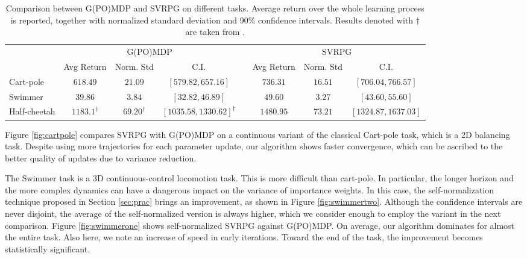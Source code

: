 \documentclass{article}
\theoremstyle{remark}
\theoremstyle{definition}
\begin{document}
\begin{table}[t]
	\caption{
		\label{tab:1}
		Comparison between G(PO)MDP and SVRPG on different tasks. Average return over the whole learning process is reported, together with normalized standard deviation and 90\% confidence intervals. Results denoted with $\dagger$ are taken from \cite{duan2016benchmarking}.}
	\centering
	\begin{tabular}{@{}lccccccc@{}} 
		\toprule
		\phantom{abc} & \multicolumn{3}{c}{G(PO)MDP} & \phantom{abc} & \multicolumn{3}{c}{SVRPG} \\
		\cmidrule{2-4} \cmidrule{6-8}
		\phantom{abc} & Avg Return & Norm. Std & C.I. & \phantom{abc}
		& Avg Return & Norm. Std & C.I.
		\\\cmidrule{2-8}
		Cart-pole & $618.49$ & $21.09$ & $[579.82, 657.16]$ & \phantom{abc} 
		& $736.31$ & $16.51$ & $[706.04, 766.57]$ \\
		Swimmer & $39.86$ & $3.84$ & $[32.82, 46.89]$ & \phantom{abc} & $49.60$ & $3.27$ & $[43.60, 55.60]$\\
		Half-cheetah & $1183.1^\dagger$ & $69.20^\dagger$ & $[1035.58, 1330.62]^\dagger$ & \phantom{abc} & $1480.95$ & $73.21$ & $[1324.87, 1637.03]$\\
		\bottomrule
	\end{tabular}
\end{table}

Figure \ref{fig:cartpole} compares SVRPG with G(PO)MDP on a continuous variant of the classical Cart-pole task, which is a 2D balancing task. {\color{blue}Despite using more trajectories for each parameter update}, our algorithm shows faster convergence, which can be ascribed to the better quality of updates due to variance reduction.

The Swimmer task is a 3D continuous-control locomotion task. This is more difficult than cart-pole. In particular, the longer horizon and the more complex dynamics can have a dangerous impact on the variance of importance weights. In this case, the self-normalization technique proposed in Section \ref{sec:prac} brings an improvement, as shown in Figure \ref{fig:swimmertwo}. Although the confidence intervals are never disjoint, the average of the self-normalized version is always higher, which we consider enough to employ the variant in the next comparison. Figure \ref{fig:swimmerone} shows self-normalized SVRPG against G(PO)MDP. On average, our algorithm dominates for almost the entire task. Also here, we note an increase of speed in early iterations. Toward the end of the task, the improvement becomes statistically significant.
\end{document}
